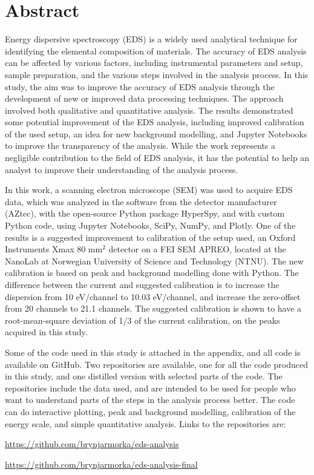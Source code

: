 \chapter*{Abstract}

Energy dispersive spectroscopy (EDS) is a widely used analytical technique for identifying the elemental composition of materials.
The accuracy of EDS analysis can be affected by various factors, including instrumental parameters and setup, sample preparation, and the various steps involved in the analysis process.
In this study, the aim was to improve the accuracy of EDS analysis through the development of new or improved data processing techniques.
The approach involved both qualitative and quantitative analysis.
The results demonstrated some potential improvement of the EDS analysis, including improved calibration of the used setup, an idea for new background modelling, and Jupyter Notebooks to improve the transparency of the analysis.
While the work represents a negligible contribution to the field of EDS analysis, it has the potential to help an analyst to improve their understanding of the analysis process.


In this work, a scanning electron microscope (SEM) was used to acquire EDS data, which was analyzed in the software from the detector manufacturer (AZtec), with the open-source Python package HyperSpy, and with custom Python code, using Jupyter Notebooks, SciPy, NumPy, and Plotly.
One of the results is a suggested improvement to calibration of the setup used, an Oxford Instruments Xmax 80 mm$^2$ detector on a FEI SEM APREO, located at the NanoLab at Norwegian University of Science and Technology (NTNU).
The new calibration is based on peak and background modelling done with Python.
The difference between the current and suggested calibration is to increase the dispersion from 10 eV/channel to 10.03 eV/channel, and increase the zero-offset from 20 channels to 21.1 channels.
The suggested calibration is shown to have a root-mean-square deviation of 1/3 of the current calibration, on the peaks acquired in this study.

Some of the code used in this study is attached in the appendix, and all code is available on GitHub.
Two repositories are available, one for all the code produced in this study, and one distilled version with selected parts of the code.
The repositories include the data used, and are intended to be used for people who want to understand parts of the steps in the analysis process better.
The code can do interactive plotting, peak and background modelling, calibration of the energy scale, and simple quantitative analysis.
Links to the repositories are:

\url{https://github.com/brynjarmorka/eds-analysis}

\url{https://github.com/brynjarmorka/eds-analysis-final}



